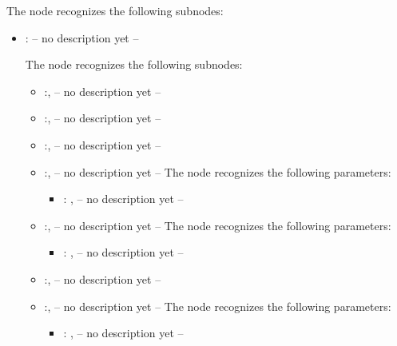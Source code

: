   The  node recognizes the following subnodes:
  \begin{itemize}
    \item {}:
      -- no description yet --

      The  node recognizes the following subnodes:
      \begin{itemize}
        \item {}:, 
          -- no description yet --

        \item {}:, 
          -- no description yet --

        \item {}:, 
          -- no description yet --

        \item {}:, 
          -- no description yet --
          The  node recognizes the following parameters:
            \begin{itemize}
              \item {}: , 
                -- no description yet --
          \end{itemize}

        \item {}:, 
          -- no description yet --
          The  node recognizes the following parameters:
            \begin{itemize}
              \item {}: , 
                -- no description yet --
          \end{itemize}

        \item {}:, 
          -- no description yet --

        \item {}:, 
          -- no description yet --
          The  node recognizes the following parameters:
            \begin{itemize}
              \item {}: , 
                -- no description yet --
          \end{itemize}
      \end{itemize}


\end{itemize}
